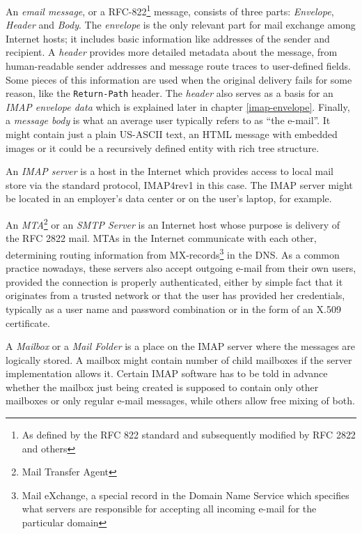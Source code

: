 \documentclass[12pt,notitlepage]{report}
\begin{document}
An {\em email message}, or a RFC-822\footnote{As defined by the RFC 822 standard
and subsequently modified by RFC 2822 \cite{rfc-2822} and others} message,
consists of three parts: {\em Envelope}, {\em Header} and {\em Body}. The {\em
envelope} is the only relevant part for mail exchange among Internet
hosts; it includes basic information like addresses of the sender and recipient.
A {\em header} provides more detailed metadata about the message, from
human-readable sender addresses and message route traces to user-defined
fields.  Some pieces of this information are used when the original delivery
fails for some reason, like the {\tt Return-Path} header.  The {\em header} also
serves as a basis for an {\em IMAP envelope data} which is explained later
in chapter \ref{imap-envelope}.  Finally, a {\em message body} is what an
average user typically refers to as ``the e-mail''.  It might contain just a
plain US-ASCII text, an HTML message with embedded images or it could be a
recursively defined entity with rich tree structure.

An {\em IMAP server} is a host in the Internet which provides access to local
mail store via the standard protocol, IMAP4rev1 in this case. The IMAP server
might be located in an employer's data center or on the user's laptop, for
example.

An {\em MTA}\footnote{Mail Transfer Agent} or an {\em SMTP Server} is an
Internet host whose purpose is delivery of the RFC 2822 mail.  MTAs in the
Internet communicate with each other, determining routing information from
MX-records\footnote{Mail eXchange, a special record in the Domain Name Service
which specifies what servers are responsible for accepting all incoming e-mail
for the particular domain} in the DNS.  As a common practice nowadays, these
servers also accept outgoing e-mail from their own users, provided the
connection is properly authenticated, either by simple fact that it originates
from a trusted network or that the user has provided her credentials, typically as
a user name and password combination or in the form of an X.509 certificate.

A {\em Mailbox} or a {\em Mail Folder} is a place on the IMAP server where the
messages are logically stored.  A mailbox might contain number of child
mailboxes if the server implementation allows it.  Certain IMAP software has to
be told in advance whether the mailbox just being created is supposed to contain
only other mailboxes or only regular e-mail messages, while others allow free
mixing of both.
\end{document}
